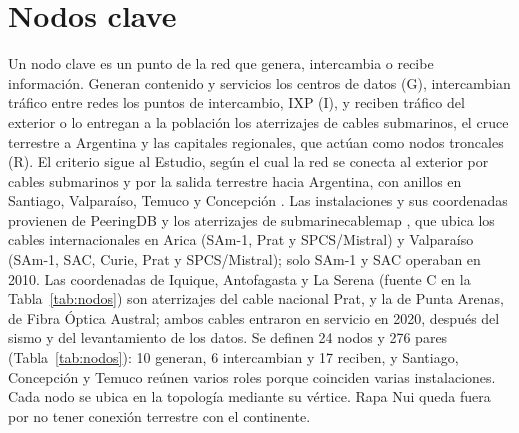 \documentclass[conference]{IEEEtran}
\begin{document}
\section{Nodos clave}
\label{sec:nodos}
Un nodo clave es un punto de la red que genera, intercambia o recibe información.
Generan contenido y servicios los centros de datos (G), intercambian tráfico entre redes los puntos de intercambio, IXP (I), y reciben tráfico del exterior o lo entregan a la población los aterrizajes de cables submarinos, el cruce terrestre a Argentina y las capitales regionales, que actúan como nodos troncales (R).
El criterio sigue al Estudio, según el cual la red se conecta al exterior por cables submarinos y por la salida terrestre hacia Argentina, con anillos en Santiago, Valparaíso, Temuco y Concepción \cite{niclabs2018}.
Las instalaciones y sus coordenadas provienen de PeeringDB \cite{peeringdb} y los aterrizajes de submarinecablemap \cite{submarinecablemap}, que ubica los cables internacionales en Arica (SAm-1, Prat y SPCS/Mistral) y Valparaíso (SAm-1, SAC, Curie, Prat y SPCS/Mistral); solo SAm-1 y SAC operaban en 2010.
Las coordenadas de Iquique, Antofagasta y La Serena (fuente C en la Tabla~\ref{tab:nodos}) son aterrizajes del cable nacional Prat, y la de Punta Arenas, de Fibra Óptica Austral; ambos cables entraron en servicio en 2020, después del sismo y del levantamiento de los datos.
Se definen 24 nodos y 276 pares (Tabla~\ref{tab:nodos}): 10 generan, 6 intercambian y 17 reciben, y Santiago, Concepción y Temuco reúnen varios roles porque coinciden varias instalaciones.
Cada nodo se ubica en la topología mediante su vértice.
Rapa Nui queda fuera por no tener conexión terrestre con el continente.
\end{document}
